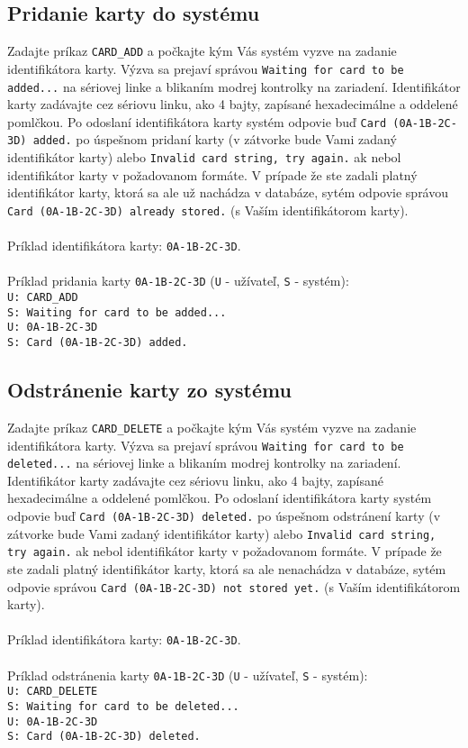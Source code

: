 \documentclass[a4paper]{article}
\begin{document}
\subsection{Pridanie karty do systému}
Zadajte príkaz \texttt{CARD\_ADD} a počkajte kým Vás systém vyzve na zadanie identifikátora karty. Výzva sa prejaví správou \texttt{Waiting for card to be added...} na sériovej linke a blikaním modrej kontrolky na zariadení. Identifikátor karty zadávajte cez sériovu linku, ako 4 bajty, zapísané hexadecimálne a oddelené pomlčkou. Po odoslaní identifikátora karty systém odpovie buď \texttt{Card (0A-1B-2C-3D) added.} po úspešnom pridaní karty (v zátvorke bude Vami zadaný identifikátor karty) alebo \texttt{Invalid card string, try again.} ak nebol identifikátor karty v požadovanom formáte. V prípade že ste zadali platný identifikátor karty, ktorá sa ale už nachádza v databáze, sytém odpovie správou \texttt{Card (0A-1B-2C-3D) already stored.} (s Vaším identifikátorom karty).
\\\\
Príklad identifikátora karty: \texttt{0A-1B-2C-3D}.
\\\\
Príklad pridania karty \texttt{0A-1B-2C-3D} (\texttt{U} - užívateľ, \texttt{S} - systém):\\
\texttt{U: CARD\_ADD}\\
\texttt{S: Waiting for card to be added...}\\
\texttt{U: 0A-1B-2C-3D}\\
\texttt{S: Card (0A-1B-2C-3D) added.}\\

\subsection{Odstránenie karty zo systému}
Zadajte príkaz \texttt{CARD\_DELETE} a počkajte kým Vás systém vyzve na zadanie identifikátora karty. Výzva sa prejaví správou \texttt{Waiting for card to be deleted...} na sériovej linke a blikaním modrej kontrolky na zariadení. Identifikátor karty zadávajte cez sériovu linku, ako 4 bajty, zapísané hexadecimálne a oddelené pomlčkou. Po odoslaní identifikátora karty systém odpovie buď \texttt{Card (0A-1B-2C-3D) deleted.} po úspešnom odstránení karty (v zátvorke bude Vami zadaný identifikátor karty) alebo \texttt{Invalid card string, try again.} ak nebol identifikátor karty v požadovanom formáte. V prípade že ste zadali platný identifikátor karty, ktorá sa ale nenachádza v databáze, sytém odpovie správou \texttt{Card (0A-1B-2C-3D) not stored yet.} (s Vaším identifikátorom karty).
\\\\
Príklad identifikátora karty: \texttt{0A-1B-2C-3D}.
\\\\
Príklad odstránenia karty \texttt{0A-1B-2C-3D} (\texttt{U} - užívateľ, \texttt{S} - systém):\\
\texttt{U: CARD\_DELETE}\\
\texttt{S: Waiting for card to be deleted...}\\
\texttt{U: 0A-1B-2C-3D}\\
\texttt{S: Card (0A-1B-2C-3D) deleted.}\\
\end{document}

